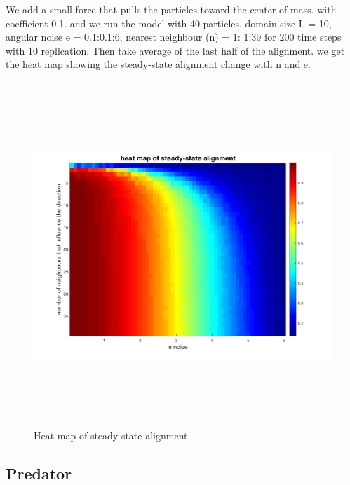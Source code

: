 \documentclass[12pt]{article}
\begin{document}
We add a small force that pulls the particles toward the center of mass. with coefficient 0.1. and we run the model with 40 particles, domain size L = 10, angular noise e = 0.1:0.1:6, nearest neighbour (n) = 1: 1:39 for 200 time steps with 10 replication. Then take average of the last half of the alignment. we get the heat map showing the steady-state alignment change with n and e.
\begin{figure}[H] %
\centering
\includegraphics[width = 16 cm, height = 13cm]{heatmap.png}
\caption{Heat map of steady state alignment}
\label{fig:hm}
\end{figure}


\subsection{Predator}
\end{document}
